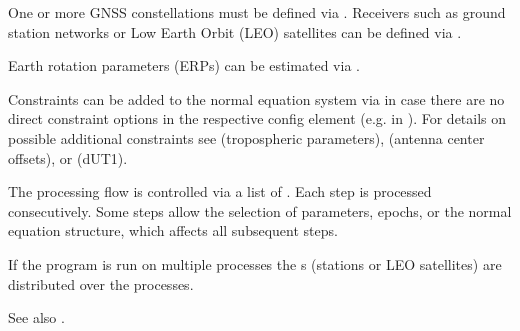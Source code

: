 One or more GNSS constellations must be defined via .
Receivers such as ground station networks or Low Earth Orbit (LEO) satellites can be defined via .

Earth rotation parameters (ERPs) can be estimated via .

Constraints can be added to the normal equation system via  in case there are no direct constraint options
in the respective config element (e.g.  in ).
For details on possible additional constraints see  (tropospheric parameters),
 (antenna center offsets), or  (dUT1).

The processing flow is controlled via a list of .
Each step is processed consecutively. Some steps allow the selection of parameters, epochs, or the normal equation structure,
which affects all subsequent steps.

If the program is run on multiple processes the s
(stations or LEO satellites) are distributed over the processes.

See also .


